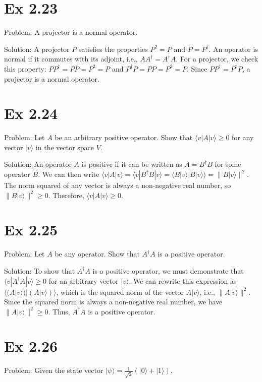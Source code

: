 \documentclass{article}
\newcommand{\0}{{$|0\rangle$}}
\newcommand{\1}{{$|1\rangle$}}
\begin{document}
\newpage
\section*{Ex 2.23  }
Problem: A projector is a normal operator.  

Solution: A projector $P$ satisfies the properties $ P^2=P $ and $ P=P^\dagger $. An operator is normal if it commutes with its adjoint, i.e., $ A A^\dagger = A^\dagger A $. For a projector, we check this property:  
$ P P^\dagger = P P = P^2 = P $ and $ P^\dagger P = P P = P^2 = P $. Since $ P P^\dagger = P^\dagger P $, a projector is a normal operator.

\newpage
\section*{Ex 2.24  }
Problem: Let $A$ be an arbitrary positive operator. Show that $ \langle v | A | v \rangle \ge 0 $ for any vector $ |v \rangle $ in the vector space $V$.  

Solution: An operator $A$ is positive if it can be written as $ A = B^\dagger B $ for some operator $B$. We can then write  
$ \langle v | A | v \rangle = \langle v | B^\dagger B | v \rangle = \langle B|v \rangle | B|v \rangle \rangle = \|B|v \rangle\|^2 $. The norm squared of any vector is always a non-negative real number, so  
$ \|B|v \rangle\|^2 \ge 0 $. Therefore, $ \langle v | A | v \rangle \ge 0 $.

\newpage
\section*{Ex 2.25  }
Problem: Let $A$ be any operator. Show that $ A^\dagger A $ is a positive operator.  

Solution: To show that $ A^\dagger A $ is a positive operator, we must demonstrate that  
$ \langle v | A^\dagger A | v \rangle \ge 0 $ for an arbitrary vector $ |v \rangle $. We can rewrite this expression as  
$ \langle (A|v \rangle) | (A|v \rangle) \rangle $, which is the squared norm of the vector $ A|v \rangle $, i.e.,  
$ \|A|v \rangle\|^2 $. Since the squared norm is always a non-negative real number, we have  
$ \|A|v \rangle\|^2 \ge 0 $. Thus, $ A^\dagger A $ is a positive operator.

\newpage
\section*{Ex 2.26  }
Problem: Given the state vector $ |\psi \rangle = \frac{1}{\sqrt{2}} (|0 \rangle + |1 \rangle) $.   
\end{document}
